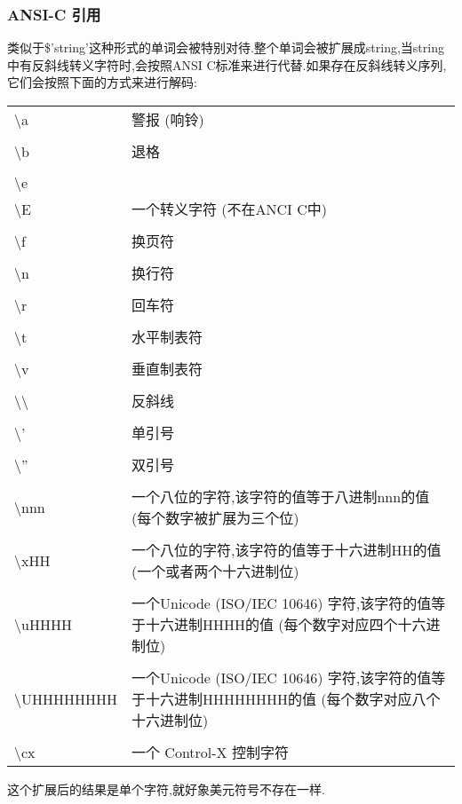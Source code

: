 \documentclass[draft,openany]{book}
\begin{document}
\begin{CJK}{UTF8}{gbsn}
    \subsubsection{ANSI-C 引用}
    类似于\$'string'这种形式的单词会被特别对待.整个单词会被扩展成string,当string中有反斜线转义字符时,会按照ANSI C标准来进行代替.如果存在反斜线转义序列,它们会按照下面的方式来进行解码:\par
    \begin{tabular}{lp{32em}}
        \textbackslash a & 警报 (响铃) \\ \\
        \textbackslash b & 退格 \\ \\
        \textbackslash e \\
        \textbackslash E & 一个转义字符 (不在ANCI C中) \\ \\
        \textbackslash f & 换页符 \\ \\
        \textbackslash n & 换行符 \\ \\
        \textbackslash r & 回车符 \\ \\
        \textbackslash t & 水平制表符 \\ \\
        \textbackslash v & 垂直制表符 \\ \\
        \textbackslash \textbackslash & 反斜线 \\ \\
        \textbackslash ' & 单引号 \\ \\
        \textbackslash '' & 双引号 \\ \\
        \textbackslash nnn & 一个八位的字符,该字符的值等于八进制nnn的值(每个数字被扩展为三个位) \\ \\
        \textbackslash xHH & 一个八位的字符,该字符的值等于十六进制HH的值(一个或者两个十六进制位) \\ \\
        \textbackslash uHHHH & 一个Unicode (ISO/IEC 10646) 字符,该字符的值等于十六进制HHHH的值 (每个数字对应四个十六进制位) \\ \\
        \textbackslash UHHHHHHHH & 一个Unicode (ISO/IEC 10646) 字符,该字符的值等于十六进制HHHHHHHH的值 (每个数字对应八个十六进制位) \\ \\
        \textbackslash cx & 一个 Control-X 控制字符
    \end{tabular}
    这个扩展后的结果是单个字符,就好象美元符号不存在一样.


\end{CJK}
\end{document}
